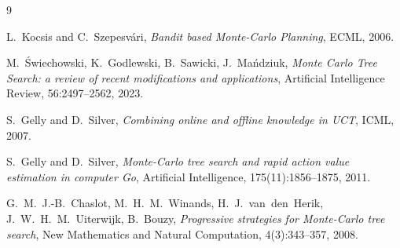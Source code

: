 \documentclass[11pt,a4paper]{article}
\begin{document}
\begin{thebibliography}{9}

L.~Kocsis and C.~Szepesvári,
\emph{Bandit based Monte-Carlo Planning},
ECML, 2006.

M.~Świechowski, K.~Godlewski, B.~Sawicki, J.~Mańdziuk,
\emph{Monte Carlo Tree Search: a review of recent modifications and
applications},
Artificial Intelligence Review, 56:2497--2562, 2023.

S.~Gelly and D.~Silver,
\emph{Combining online and offline knowledge in UCT},
ICML, 2007.

S.~Gelly and D.~Silver,
\emph{Monte-Carlo tree search and rapid action value estimation in
computer Go},
Artificial Intelligence, 175(11):1856--1875, 2011.

G.~M.~J.-B.~Chaslot, M.~H.~M.~Winands, H.~J.~van~den~Herik,
J.~W.~H.~M.~Uiterwijk, B.~Bouzy,
\emph{Progressive strategies for Monte-Carlo tree search},
New Mathematics and Natural Computation, 4(3):343--357, 2008.

\end{thebibliography}
\end{document}
